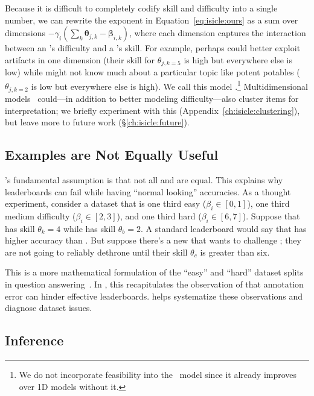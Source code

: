 Because it is difficult to completely codify skill and difficulty into
a single number, we can rewrite the exponent in
Equation~\ref{eq:isicle:ours} as a sum over dimensions
$-\gamma_i(\sum_k \bm{\theta}_{j,k}-\bm{\beta}_{i,k})$,
where each dimension captures the interaction between an \itm{}'s
difficulty and a \subj{}'s skill.
%
For example, perhaps \dumb{} could better exploit artifacts in one
dimension (their skill for $\theta_{j,k=5}$ is high but everywhere
else is low) while \smart{} might not know much about a particular
topic like potent potables ($\theta_{j,k=2}$ is low but everywhere
else is high).
%
We call this model {\bf {}}.\footnote{
  We do not incorporate feasibility into the ~model since it already improves over 1D models without it.
}
%
Multidimensional \irt{} models~\citep{reckase2009mirt} could---in addition to better modeling
difficulty---also cluster items for interpretation; we briefly
experiment with this (Appendix~\ref{ch:isicle:clustering}), but leave
more to future work (\S\ref{ch:isicle:future}).

\subsection{Examples are Not Equally Useful}

\irt{}'s fundamental assumption is that not all \itms{} and
\subjs{} are equal.
This explains why leaderboards can fail while having
``normal looking'' accuracies.
%
As a thought experiment, consider a dataset that is one third easy
($\beta_i \in [0,1]$), one third medium difficulty
($\beta_i \in [2,3]$), and one third hard ($\beta_i \in [6,7]$).
%
Suppose that \smart{} has skill $\theta_{k}=4$ while \dumb{} has skill
$\theta_{b}= 2$.
%
A standard leaderboard would say that \smart{} has higher accuracy
than \dumb{}.
%
But suppose there's a new \subj{} that wants to challenge \smart{};
they are not going to reliably dethrone \smart{} until their skill
$\theta_{c}$ is greater than six.

This is a more mathematical formulation of the ``easy'' and ``hard''
dataset splits in question
answering~\citep{sugawara2018easier,Rondeau2018-um,sen2020learn}.
%
In , this recapitulates the observation of
\citet{boydgraber2020nerds} that annotation error can hinder effective
leaderboards.
%
\name{} helps systematize these observations and diagnose dataset issues.


\subsection{Inference}

